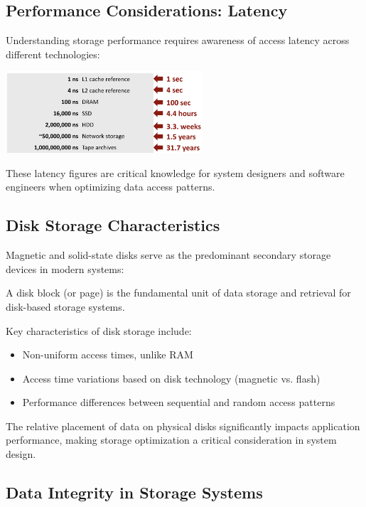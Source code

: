 \documentclass[../../compsys.tex]{subfiles}
\begin{document}
\newpage
\subsection{Performance Considerations: Latency}

Understanding storage performance requires awareness of access latency across different technologies:

\begin{center}
    \includegraphics[width=0.55\textwidth]{chapters/L8/images/latency.png}
\end{center}

These latency figures are critical knowledge for system designers and software engineers when optimizing data access patterns.

\subsection{Disk Storage Characteristics}

Magnetic and solid-state disks serve as the predominant secondary storage devices in modern systems:

\begin{definition}
A disk block (or page) is the fundamental unit of data storage and retrieval for disk-based storage systems.
\end{definition}

Key characteristics of disk storage include:
\begin{itemize}
    \item Non-uniform access times, unlike RAM
    \item Access time variations based on disk technology (magnetic vs. flash)
    \item Performance differences between sequential and random access patterns
\end{itemize}

The relative placement of data on physical disks significantly impacts application performance, making storage optimization a critical consideration in system design.

\subsection{Data Integrity in Storage Systems}
\end{document}
